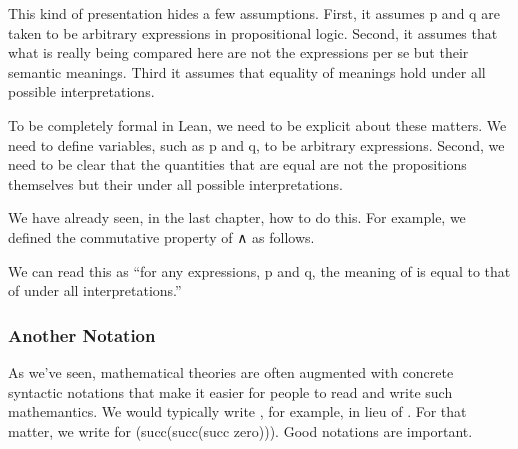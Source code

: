\documentclass[letterpaper,10pt,english]{sphinxmanual}
\begin{document}
\sphinxAtStartPar
This kind of presentation hides a few assumptions. First,
it assumes p and q are taken to be arbitrary expressions
in propositional logic. Second, it assumes that what is
really being compared here are not the expressions per se
but their semantic meanings. Third it assumes that equality
of meanings hold under all possible interpretations.

\sphinxAtStartPar
To be completely formal in Lean, we need to be explicit
about these matters. We need to define variables, such as
p and q, to be arbitrary expressions. Second, we need to
be clear that the quantities that are equal are not the
propositions themselves but their  under all
possible interpretations.

\sphinxAtStartPar
We have already seen, in the last chapter, how to do this.
For example, we defined the commutative property of ∧ as
follows.

\begin{sphinxVerbatim}[commandchars=\\\{\}]
 
         
             
  
\end{sphinxVerbatim}

\sphinxAtStartPar
We can read this as “for any expressions, p and q, the
meaning of  is equal to that of  under all
interpretations.”


\subsubsection{Another Notation}
\label{\detokenize{A_01_Propositional_Logic:another-notation}}
\sphinxAtStartPar
As we’ve seen, mathematical theories are often
augmented with concrete syntactic notations that
make it easier for people to read and write such
mathemantics. We would typically write ,
for example, in lieu of . For that
matter, we write  for (succ(succ(succ zero))).
Good notations are important.
\end{document}
